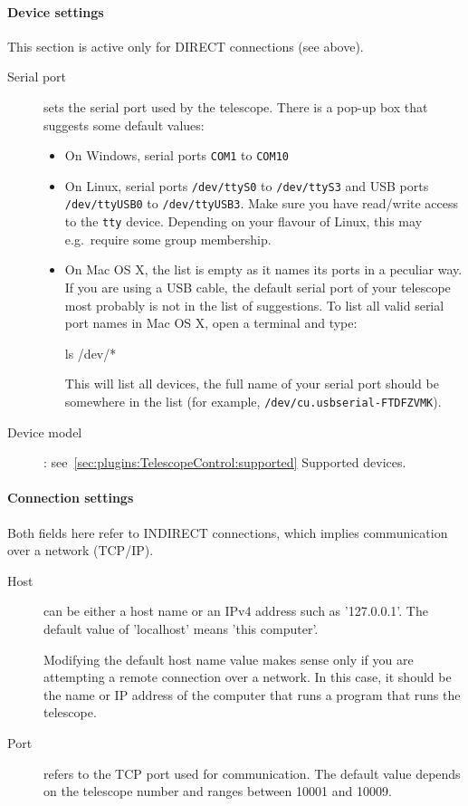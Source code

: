 \paragraph{Device settings}
This section is active only for DIRECT connections (see above).

\begin{description}
\item[Serial port] sets the serial port used by the telescope.  There
  is a pop-up box that suggests some default values:
  \begin{itemize}
  \item On Windows, serial ports \texttt{COM1} to \texttt{COM10}
  \item On Linux, serial ports \texttt{/dev/ttyS0} to
    \texttt{/dev/ttyS3} and USB ports \texttt{/dev/ttyUSB0} to
    \texttt{/dev/ttyUSB3}. Make sure you have read/write access to the \texttt{tty} device. 
	Depending on your flavour of Linux, this may e.g.\ require some group membership.
  \item On Mac OS X, the list is empty as it names its ports in a
    peculiar way.
  If you are using a USB cable, the default serial port of your
  telescope most probably is not in the list of suggestions.  To list
  all valid serial port names in Mac OS X, open a terminal and type:

\begin{commands}
  ls /dev/*
\end{commands}
%
This will list all devices, the full name of your serial port should
be somewhere in the list (for example,
\texttt{/dev/cu.usbserial-FTDFZVMK}).
\end{itemize}

\item[Device model]: see~\ref{sec:plugins:TelescopeControl:supported} Supported devices.
\end{description}

\paragraph{Connection settings}
Both fields here refer to INDIRECT connections, which implies communication over a network (TCP/IP). 
\begin{description}
\item[Host] can be either a host name or an IPv4 address such as
  '127.0.0.1'.  The default value of 'localhost' means 'this
  computer'. 

  Modifying the default host name value makes sense only if you are
  attempting a remote connection over a network. In this case, it
  should be the name or IP address of the computer that runs a program
  that runs the telescope.
\item[Port] refers to the TCP port used for communication. The default
  value depends on the telescope number and ranges between 10001 and
  10009.
\end{description}

